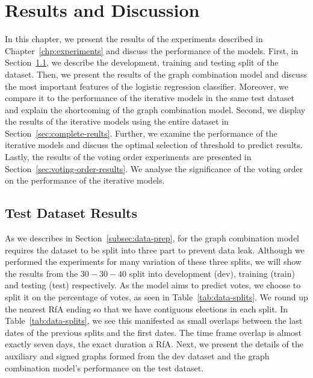 \chapter{Results and Discussion} 
\label{chp:results}
In this chapter, we present the results of the experiments described in Chapter~\ref{chp:experiments} and discuss the performance of the models.
First, in Section~\ref{sec:test-data-results}, we describe the development, training and testing split of the dataset.
Then, we present the results of the graph combination model and discuss the most important features of the logistic regression classifier.
Moreover, we compare it to the performance of the iterative models in the same test dataset and explain the shortcoming of the graph combination model.
Second, we display the results of the iterative models using the entire \wikirfa dataset in Section~\ref{sec:complete-reults}.
Further, we examine the performance of the iterative models and discuss the optimal selection of threshold to predict results.
Lastly, the results of the voting order experiments are presented in Section~\ref{sec:voting-order-results}.
We analyse the significance of the voting order on the performance of the iterative models.


\section{Test Dataset Results}
\label{sec:test-data-results}
As we describes in Section~\ref{subsec:data-prep}, for the graph combination model requires the \wikirfa dataset to be split into three part to prevent data leak.
Although we performed the experiments for many variation of these three splits, we will show the results from the $30-30-40$ split into development (dev), training (train) and testing (test) respectively.
As the model aims to predict votes, we choose to split it on the percentage of votes, as seen in Table~\ref{tab:data-splits}.
We round up the nearest RfA ending so that we have contiguous elections in each split.
In Table~\ref{tab:data-splits}, we see this manifested as small overlaps between the last dates of the previous splits and the first dates.
The time frame overlap is almost exactly seven days, the exact duration a RfA.
Next, we present the details of the auxiliary and signed graphs formed from the dev dataset and the graph combination model's performance on the test dataset.

